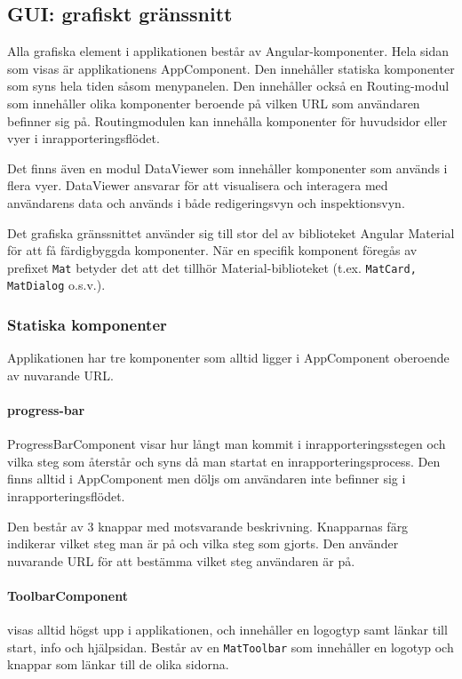 \documentclass[techdoc/techdock.tex]{subfiles}
\begin{document}
\subsection{GUI: grafiskt gränssnitt}
Alla grafiska element i applikationen består av Angular-komponenter. Hela sidan
som visas är applikationens AppComponent. Den innehåller statiska komponenter
som syns hela tiden såsom menypanelen. Den innehåller också en Routing-modul
som innehåller olika komponenter beroende på vilken URL som användaren befinner
sig på. Routingmodulen kan innehålla komponenter för huvudsidor eller vyer i
inrapporteringsflödet.

Det finns även en modul DataViewer som innehåller komponenter som används i
flera vyer. DataViewer ansvarar för att visualisera och interagera med
användarens data och används i både redigeringsvyn och inspektionsvyn.

Det grafiska gränssnittet använder sig till stor del av biblioteket Angular
Material för att få färdigbyggda komponenter. När en specifik komponent föregås
av prefixet \texttt{Mat} betyder det att det tillhör Material-biblioteket
(t.ex. \texttt{MatCard, MatDialog} o.s.v.).

\subsubsection{Statiska komponenter}
Applikationen har tre komponenter som alltid ligger i AppComponent oberoende av
nuvarande URL.

\paragraph{progress-bar}
ProgressBarComponent visar hur långt man kommit i inrapporteringsstegen och
vilka steg som återstår och syns då man startat en inrapporteringsprocess. Den
finns alltid i AppComponent men döljs om användaren inte befinner sig i
inrapporteringsflödet.

Den består av 3 knappar med motsvarande beskrivning. Knapparnas färg indikerar
vilket steg man är på och vilka steg som gjorts. Den använder nuvarande URL för
att bestämma vilket steg användaren är på.

\paragraph{ToolbarComponent}
visas alltid högst upp i applikationen, och innehåller en logogtyp samt länkar
till start, info och hjälpsidan. Består av en \texttt{MatToolbar} som
innehåller en logotyp och knappar som länkar till de olika sidorna.
\end{document}
